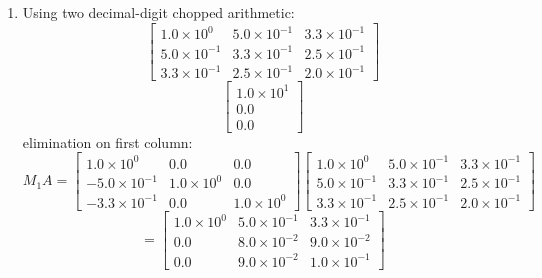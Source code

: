 \documentclass[11pt,twoside]{article}
\begin{document}
\begin{enumerate}
\begin{enumerate}
\[\begin{bmatrix}
				\frac{1}{3} & \frac{1}{4} & \frac{1}{5} \end{bmatrix}
				 \right. 
				 = 
				 \left. \begin{bmatrix}
				1    & 0.5& 0.33 \\
				0.50 & 0.33& 0.25\\
				0.33 & 0.25& 0.20\end{bmatrix}
				 \right.
				  = 
				\left. \begin{bmatrix}
				1.0\times 10^0         & 5.0 \times 10^{-1} & 3.3 \times 10^{-1} \\
				5.0 \times 10^{-1} & 3.3 \times 10^{-1} & 2.5 \times 10^{-1} \\
				3.3 \times 10^{-1}  & 2.5 \times 10^{-1} & 2.0 \times 10^{-1}\end{bmatrix}
				 \right.\]
				 
				\[ \left. \begin{bmatrix} 
				1.0 \times 10^1  \\
				0.0   \\
				0.0  \end{bmatrix} \right.  \] 
		\item		Using two decimal-digit chopped arithmetic:
				\[\left. \begin{bmatrix}
				1.0\times 10^0         & 5.0 \times 10^{-1} & 3.3 \times 10^{-1} \\
				5.0 \times 10^{-1} & 3.3 \times 10^{-1} & 2.5 \times 10^{-1} \\
				3.3 \times 10^{-1}  & 2.5 \times 10^{-1} & 2.0 \times 10^{-1}\end{bmatrix}
				 \right.\]
				 \[ \left. \begin{bmatrix} 
				1.0 \times 10^1  \\
				0.0   \\
				0.0  \end{bmatrix} \right.  \] 
				elimination on first column:
				\[ M_1 A = 
				\left. \begin{bmatrix}
				1.0\times 10^0         & 0.0 & 0.0 \\
				-5.0 \times 10^{-1} & 1.0\times 10^0  &0.0\\
				-3.3 \times 10^{-1}  & 0.0 & 1.0\times 10^0  \end{bmatrix}
				 \right. 
				\left. \begin{bmatrix}
				1.0\times 10^0         & 5.0 \times 10^{-1} & 3.3 \times 10^{-1} \\
				5.0 \times 10^{-1} & 3.3 \times 10^{-1} & 2.5 \times 10^{-1} \\
				3.3 \times 10^{-1}  & 2.5 \times 10^{-1} & 2.0 \times 10^{-1}\end{bmatrix}
				 \right. \]
				 \[ = 
				 \left. \begin{bmatrix}
				1.0\times 10^0 & 5.0 \times 10^{-1} & 3.3 \times 10^{-1}\\
				0.0                & 8.0 \times 10^{-2} & 9.0 \times 10^{-2} \\
				0.0                & 9.0 \times 10^{-2}  & 1.0 \times 10^{-1} \end{bmatrix}
				 \right. \]
				 

\end{enumerate}
\end{enumerate}
\end{document}
